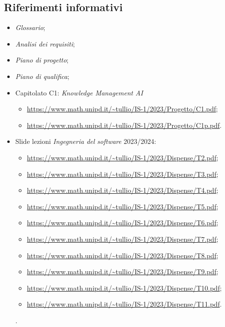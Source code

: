 \documentclass[10pt, a4paper]{article}
\begin{document}
    \subsection{Riferimenti informativi}
    \begin{itemize}
        \item \textit{Glossario};
        \item \textit{Analisi dei requisiti};
        \item \textit{Piano di progetto};
        \item \textit{Piano di qualifica};
        \item Capitolato C1: \textit{Knowledge Management AI}
            \begin{itemize}
                \item \url{https://www.math.unipd.it/~tullio/IS-1/2023/Progetto/C1.pdf};
                \item \url{https://www.math.unipd.it/~tullio/IS-1/2023/Progetto/C1p.pdf}.
            \end{itemize}
        \item Slide lezioni \textit{Ingegneria del software} 2023/2024:
            \begin{itemize}
                \item \url{https://www.math.unipd.it/~tullio/IS-1/2023/Dispense/T2.pdf};
                \item \url{https://www.math.unipd.it/~tullio/IS-1/2023/Dispense/T3.pdf};
                \item \url{https://www.math.unipd.it/~tullio/IS-1/2023/Dispense/T4.pdf};
                \item \url{https://www.math.unipd.it/~tullio/IS-1/2023/Dispense/T5.pdf};
                \item \url{https://www.math.unipd.it/~tullio/IS-1/2023/Dispense/T6.pdf};
                \item \url{https://www.math.unipd.it/~tullio/IS-1/2023/Dispense/T7.pdf};
                \item \url{https://www.math.unipd.it/~tullio/IS-1/2023/Dispense/T8.pdf};
                \item \url{https://www.math.unipd.it/~tullio/IS-1/2023/Dispense/T9.pdf};
                \item \url{https://www.math.unipd.it/~tullio/IS-1/2023/Dispense/T10.pdf};
                \item \url{https://www.math.unipd.it/~tullio/IS-1/2023/Dispense/T11.pdf}.
            \end{itemize}.
    \end{itemize}
\end{document}
